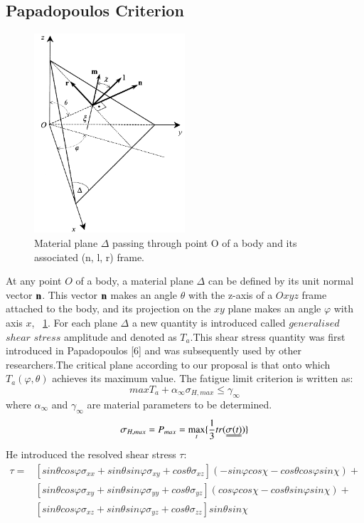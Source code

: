 \documentclass[3p,times,procedia,number]{elsarticle}
\newcommand{\figref}[1]{\figurename~\ref{#1}}
\begin{document}
\subsection{Papadopoulos Criterion}
         \begin{figure}[h!]
         	\centering
         	\includegraphics[width=0.5\textwidth]{figures//demopp.png} 
         	\caption{Material plane $\Delta$ passing through point O of a body and its
         		associated (n, l, r) frame.}
         	\label{fig50}
         \end{figure}
         At any point $O$ of a body, a material plane $\Delta$ can be defined by its unit normal vector $\bf n$. This vector
         $\bf n$ makes an angle $\theta$ with the z-axis of a $Oxyz$ frame attached to the body, and its projection on the $xy$ plane
         makes an angle $\varphi$ with axis $x$, \figref{fig50}. For each plane $\Delta$ a new quantity is introduced called $generalised$ $shear$ $stress$ amplitude and denoted as $T_a$.This shear stress quantity was first introduced in Papadopoulos [6]
         and was subsequently used by other researchers.The critical plane according to our proposal is that onto which $T_a(\varphi,\theta)$ achieves its maximum value. The fatigue limit criterion is written as:
         \begin{equation}
         	max T_a+\alpha_\infty \sigma_{H,max}\leqslant \gamma_\infty
         \end{equation}
         where $\alpha_\infty$ and $\gamma_\infty$ are material parameters to be determined\cite{papadopoulos2001long}.
         $$\sigma_{H,max}=P_{max}=\max\limits_{t}\{\frac{1}{3}tr(\uuline{\sigma(t)})\}$$
         He introduced the resolved shear stress $\tau$:
         \begin{equation}
         	\begin{split}
         		\tau=&[sin\theta cos\varphi\sigma_{xx}+sin\theta sin\varphi\sigma_{xy}+cos\theta\sigma_{xz}](-sin\varphi cos\chi-cos\theta cos\varphi sin\chi)+\\&[sin\theta cos\varphi\sigma_{xy}+sin\theta sin\varphi\sigma_{yy}+cos\theta\sigma_{yz}](cos\varphi cos\chi-cos\theta sin\varphi sin\chi)+\\&[sin\theta cos\varphi\sigma_{xz}+sin\theta sin\varphi\sigma_{yz}+cos\theta\sigma_{zz}]sin\theta sin\chi
         	\end{split} 
         	\label{eqres}
         \end{equation}
\end{document}
